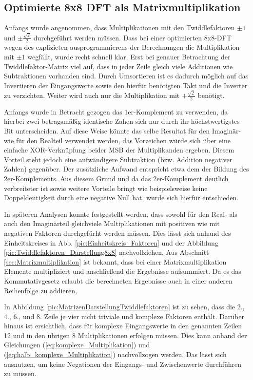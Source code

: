 \subsection{Optimierte 8x8 DFT als Matrixmultiplikation}\label{sec:OptimierteMatrixmultiplikation}


Anfangs wurde angenommen, dass Multiplikationen mit den Twiddlefaktoren $\pm 1$ und $\pm\frac{\sqrt{2}}{2}$ durchgeführt werden müssen. 
Dass bei einer optimierten 8x8-DFT wegen des explizieten ausprogrammierens der Berechnungen die Multiplikation mit $\pm1$ wegfällt, wurde recht schnell klar.
Erst bei genauer Betrachtung der Twiddlefaktor-Matrix viel auf, dass in jeder Zeile gleich viele Additionen wie Subtraktionen vorhanden sind. Durch Umsortieren 
ist es dadurch möglich auf das Invertieren der Eingangswerte sowie den hierfür benötigten Takt und die Inverter zu verzichten. Weiter wird auch nur die Multiplikation
mit $+\frac{\sqrt{2}}{2}$ benötigt.

Anfangs wurde in Betracht gezogen das 1er-Komplement zu verwenden, da hierbei zwei betragsmäßig identische Zahen sich nur durch ihr höchstwertigstes 
 Bit unterscheiden. Auf diese Weise könnte das selbe Resultat für den Imaginär- wie für den Realteil verwendet werden, das Vorzeichen würde sich über eine 
 einfache XOR-Verknüpfung beider MSB der Multiplikanden ergeben.
 Diesem Vorteil steht jedoch eine aufwändigere Subtraktion (bzw. Addition negativer Zahlen) gegenüber. Der zusätzliche Aufwand entspricht 
 etwa dem der Bildung des 2er-Komplements. Aus diesem Grund und da das 2er-Komplement deutlich verbreiteter ist sowie weitere Vorteile bringt wie 
 beispielsweise keine Doppeldeutigkeit durch eine negative Null hat, wurde sich hierfür entschieden.
 
 
 In späteren Analysen konnte festgestellt werden, dass sowohl für den Real- als auch den Imaginärteil gleichviele Multiplikationen mit positiven wie mit negativen Faktoren 
 durchgefürht werden müssen. Dies lässt sich anhand des Einheitskreises in Abb. \ref{pic:Einheitskreis_Faktoren} und der Abbildung \ref{pic:Twiddlefaktoren_Darstellung8x8}
 nachvollziehen. Aus Abschnitt \ref{sec:Matrixmultiplikation} ist bekannt, dass bei einer Matrixmultiplikation Elemente multipliziert und anschließend die Ergebnisse 
 aufsummiert. Da es das Kommutativgesetz erlaubt die berechneten Ergebnisse auch in einer anderen Reihenfolge zu addieren, 

 
   
 In Abbildung \ref{pic:MatrizenDarstellungTwiddlefaktoren} ist zu sehen, dass die 2., 4., 6., und 8. Zeile je vier nicht triviale und komplexe Faktoren enthält. 
 Darüber hinaus ist ersichtlich, dass für komplexe Eingangswerte in den genannten Zeilen 12 und in den übrigen 8 Multiplikationen erfolgen müssen. Dies kann anhand der 
 Gleichungen (\ref{eq:komplexe_Multiplikation}) und (\ref{eq:halb_komplexe_Multiplikation}) nachvollzogen werden.
 Das lässt sich ausnutzen, um keine Negationen der Eingangs- und Zwischenwerte durchführen zu müssen. 
 

